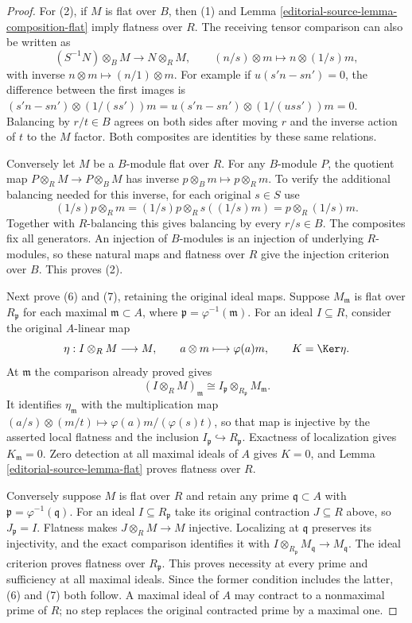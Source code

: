 \begin{proof}
For (2), if $M$ is flat over $B$, then (1) and
Lemma \ref{editorial-source-lemma-composition-flat} imply flatness over $R$.
The receiving tensor comparison can also be written as
$$
(S^{-1}N)\otimes_B M\longrightarrow N\otimes_R M,
\qquad (n/s)\otimes m\longmapsto n\otimes(1/s)m,
$$
with inverse $n\otimes m\mapsto(n/1)\otimes m$.
For example if $u(s'n-sn')=0$, the difference between
the first images is
$(s'n-sn')\otimes(1/(ss'))m
=u(s'n-sn')\otimes(1/(uss'))m=0$.
Balancing by $r/t\in B$ agrees on both sides after
moving $r$ and the inverse action of $t$ to the $M$ factor.
Both composites are identities by these same relations.

Conversely let $M$ be a $B$-module flat over $R$.
For any $B$-module $P$, the quotient map
$P\otimes_R M\to P\otimes_B M$ has inverse
$p\otimes_B m\mapsto p\otimes_R m$.
To verify the additional balancing needed for this inverse,
for each original $s\in S$ use
$$
(1/s)p\otimes_R m
=(1/s)p\otimes_R s((1/s)m)
=p\otimes_R(1/s)m.
$$
Together with $R$-balancing this gives balancing by every
$r/s\in B$. The composites fix all generators.
An injection of $B$-modules is an injection of underlying
$R$-modules, so these natural maps and flatness over $R$
give the injection criterion over $B$. This proves (2).

Next prove (6) and (7), retaining the original ideal maps.
Suppose $M_{\mathfrak m}$ is flat over $R_{\mathfrak p}$
for each maximal $\mathfrak m\subset A$, where
$\mathfrak p=\varphi^{-1}(\mathfrak m)$.
For an ideal $I\subseteq R$, consider the original
$A$-linear map
$$
\eta:I\otimes_R M\longrightarrow M,
\qquad a\otimes m\longmapsto\varphi(a)m,
\qquad K=\Ker\eta.
$$
At $\mathfrak m$ the comparison already proved gives
$$
(I\otimes_R M)_{\mathfrak m}
\cong I_{\mathfrak p}\otimes_{R_{\mathfrak p}}M_{\mathfrak m}.
$$
It identifies $\eta_{\mathfrak m}$ with the multiplication
map $(a/s)\otimes(m/t)\mapsto\varphi(a)m/(\varphi(s)t)$,
so that map is injective by the asserted local flatness
and the inclusion $I_{\mathfrak p}\hookrightarrow R_{\mathfrak p}$.
Exactness of localization gives $K_{\mathfrak m}=0$.
Zero detection at all maximal ideals of $A$ gives $K=0$,
and Lemma \ref{editorial-source-lemma-flat} proves flatness over $R$.

Conversely suppose $M$ is flat over $R$ and retain any
prime $\mathfrak q\subset A$ with
$\mathfrak p=\varphi^{-1}(\mathfrak q)$.
For an ideal $I\subseteq R_{\mathfrak p}$ take its original
contraction $J\subseteq R$ above, so $J_{\mathfrak p}=I$.
Flatness makes $J\otimes_R M\to M$ injective. Localizing
at $\mathfrak q$ preserves its injectivity, and the exact
comparison identifies it with
$I\otimes_{R_{\mathfrak p}}M_{\mathfrak q}\to M_{\mathfrak q}$.
The ideal criterion proves flatness over $R_{\mathfrak p}$.
This proves necessity at every prime and sufficiency at
all maximal ideals. Since the former condition includes
the latter, (6) and (7) both follow. A maximal ideal of
$A$ may contract to a nonmaximal prime of $R$; no step
replaces the original contracted prime by a maximal one.


\end{proof}
